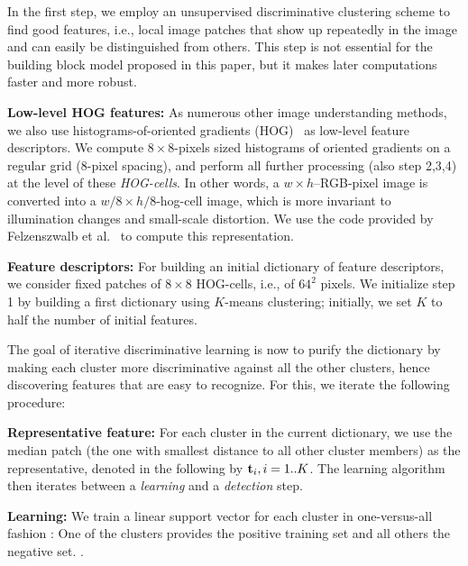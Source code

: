 \documentclass{acmtog}
\begin{document}
In the first step, we employ an unsupervised discriminative clustering scheme to find good features, i.e., local image patches that show up repeatedly in the image and can easily be distinguished from others. This step is not essential for the building block model proposed in this paper, but it makes later computations faster and more robust. %

\textbf{Low-level HOG features:} As numerous other image understanding methods, we also use histograms-of-oriented gradients (HOG)~\cite{DALALcvpr2005} as low-level feature descriptors. We compute $8\times 8$-pixels sized histograms of oriented gradients on a regular grid (8-pixel spacing), and perform all further processing (also step 2,3,4) at the level of these \emph{HOG-cells}. In other words, a $w \times h$--RGB-pixel image is converted into a $w/8 \times h/8$-hog-cell image, which is more invariant to illumination changes and small-scale distortion. We use the code provided by Felzenszwalb et al.~ to compute this representation.

\textbf{Feature descriptors:} For building an initial dictionary of feature descriptors, we consider fixed patches of $8 \times 8$ HOG-cells, i.e., of $64^2$ pixels. We initialize step 1 by building a first dictionary using $K$-means clustering; initially, we set $K$ to half the number of initial features.

The goal of iterative discriminative learning is now to purify the dictionary by making each cluster more discriminative against all the other clusters, hence discovering features that are easy to recognize. For this, we iterate the following procedure:
 
\textbf{Representative feature:} For each cluster in the current dictionary, we use the median patch (the one with smallest distance to all other cluster members) as the representative, denoted in the following by $\mathbf{t}_i, i = 1..K$. The learning algorithm then iterates between a \emph{learning} and a \emph{detection} step.

\textbf{Learning:} We train a linear support vector for each cluster in one-versus-all fashion : One of the clusters provides the positive training set and all others the negative set. .
\end{document}
